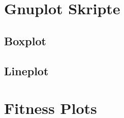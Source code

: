 \begin{appendix}
\chapter{Gnuplot Skripte}
\section{Boxplot}
\tiny

\label{append_Script_Box-plot}
\newpage
%
\section{Lineplot}
\tiny 
%

\label{append_Script_Line-plot}
\newpage
%
\chapter{Fitness Plots}

\end{appendix}
